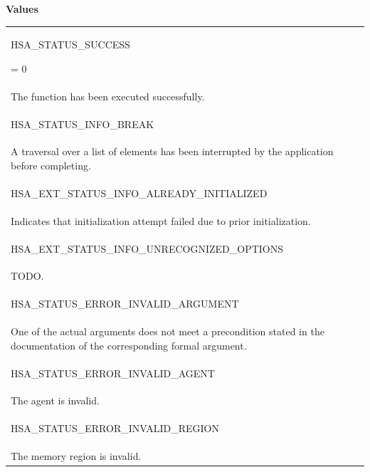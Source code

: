 \documentclass[final]{book}
\newcommand{\reftyp}[1]{#1}
\newcommand{\refenu}[1]{\reftyp{#1}}
\begin{document}
\noindent\textbf{Values}\\[-5mm]
\begin{longtable}{@{\hspace{2em}}p{\linewidth-2em}}
\hspace{-2em}\hypertarget{group__status_1ggad755322e7ff95456520e8abdbe90d225ae382ea0c9c05cce5a60d0317375159cc}{\refenu{HSA_\-STATUS_\-SUCCESS}} = 0\\The function has been executed successfully.\\[2mm]
\hspace{-2em}\hypertarget{group__status_1ggad755322e7ff95456520e8abdbe90d225a86c476121ca787ff75f6a4676507b221}{\refenu{HSA_\-STATUS_\-INFO_\-BREAK}} \\A traversal over a list of elements has been interrupted by the application before completing.\\[2mm]
\hspace{-2em}\hypertarget{group__status_1ggad755322e7ff95456520e8abdbe90d225a0882e3ebb9cc8a5c6033c43ee7a6d898}{\refenu{HSA_\-EXT_\-STATUS_\-INFO_\-ALREADY_\-INITIALIZED}} \\Indicates that initialization attempt failed due to prior initialization.\\[2mm]
\hspace{-2em}\hypertarget{group__status_1ggad755322e7ff95456520e8abdbe90d225a60343279bea68766b037297915b5f903}{\refenu{HSA_\-EXT_\-STATUS_\-INFO_\-UNRECOGNIZED_\-OPTIONS}} \\TODO.\\[2mm]
\hspace{-2em}\hypertarget{group__status_1ggad755322e7ff95456520e8abdbe90d225ac7d3651f75107d2a6a8ba3b25683c030}{\refenu{HSA_\-STATUS_\-ERROR_\-INVALID_\-ARGUMENT}} \\One of the actual arguments does not meet a precondition stated in the documentation of the corresponding formal argument.\\[2mm]
\hspace{-2em}\hypertarget{group__status_1ggad755322e7ff95456520e8abdbe90d225a3a5d835c109c2d0ad5b9c2771e133e5d}{\refenu{HSA_\-STATUS_\-ERROR_\-INVALID_\-AGENT}} \\The agent is invalid.\\[2mm]
\hspace{-2em}\hypertarget{group__status_1ggad755322e7ff95456520e8abdbe90d225ad63594ac02edec7ae7aa7722c11afcd9}{\refenu{HSA_\-STATUS_\-ERROR_\-INVALID_\-REGION}} \\The memory region is invalid.\\[2mm]

\end{longtable}
\end{document}
